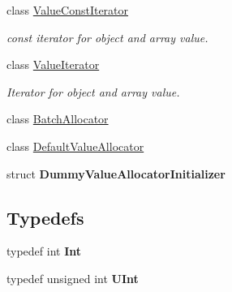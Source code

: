 \begin{DoxyCompactItemize}
class \hyperlink{class_json_1_1_value_const_iterator}{Value\-Const\-Iterator}
\begin{DoxyCompactList}\small\item\em const iterator for object and array value. \end{DoxyCompactList}\item 
class \hyperlink{class_json_1_1_value_iterator}{Value\-Iterator}
\begin{DoxyCompactList}\small\item\em Iterator for object and array value. \end{DoxyCompactList}\item 
class \hyperlink{class_json_1_1_batch_allocator}{Batch\-Allocator}
\item 
class \hyperlink{class_json_1_1_default_value_allocator}{Default\-Value\-Allocator}
\item 
struct {\bfseries Dummy\-Value\-Allocator\-Initializer}
\end{DoxyCompactItemize}
\subsection*{Typedefs}
\begin{DoxyCompactItemize}
\item 
\hypertarget{namespace_json_a08122e8005b706d982e48cca1e2119c7}{typedef int {\bfseries Int}}\label{namespace_json_a08122e8005b706d982e48cca1e2119c7}

\item 
\hypertarget{namespace_json_a800fb90eb6ee8d5d62b600c06f87f7d4}{typedef unsigned int {\bfseries U\-Int}}\label{namespace_json_a800fb90eb6ee8d5d62b600c06f87f7d4}

\end{DoxyCompactItemize}
